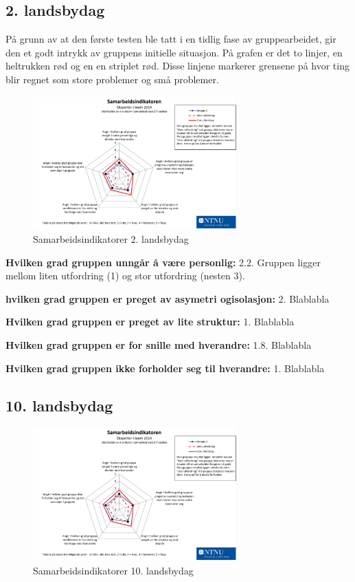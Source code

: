 \subsection{2. landsbydag}
På grunn av at den første testen ble tatt i en tidlig fase av gruppearbeidet, gir den et godt intrykk av gruppens initielle situasjon. 
På grafen er det to linjer, en heltrukken rød og en en striplet rød. 
Disse linjene markerer grensene på hvor ting blir regnet som store problemer og små problemer. 
\begin{figure}[H]
    \centering
    \includegraphics[width=0.7\textwidth]{images/samarbeidsindikator1.jpeg}	
    \caption{Samarbeidsindikatorer 2. landsbydag}
    \label{fig:sam1}
\end{figure}

\noindent \textbf{Hvilken grad gruppen unngår å være personlig:} 2.2.
\newline
\noindent Gruppen ligger mellom liten utfordring (1) og stor utfordring (nesten 3).
\vspace{\secspace}

\noindent \textbf{hvilken grad gruppen er preget av asymetri ogisolasjon:} 2.
\newline
\noindent Blablabla
\vspace{\secspace}

\noindent \textbf{Hvilken grad gruppen er preget av lite struktur:} 1.
\newline
\noindent Blablabla
\vspace{\secspace}

\noindent \textbf{Hvilken grad gruppen er for snille med hverandre:} 1.8.
\newline
\noindent Blablabla
\vspace{\secspace}

\noindent \textbf{Hvilken grad gruppen ikke forholder seg til hverandre:} 1.
\newline
\noindent Blablabla

\subsection{10. landsbydag}
\begin{figure}[H]
    \centering
    \includegraphics[width=0.7\textwidth]{images/samarbeidsindikator1.jpeg}	
    \caption{Samarbeidsindikatorer 10. landsbydag}
    \label{fig:sam2}
\end{figure}

